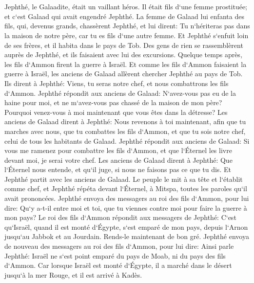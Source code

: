 \chapter{}

\verse Jephthé, le Galaadite, était un vaillant héros. Il était fils d`une femme prostituée; et c`est Galaad qui avait engendré Jephthé. 
\verse La femme de Galaad lui enfanta des fils, qui, devenus grands, chassèrent Jephthé, et lui dirent: Tu n`hériteras pas dans la maison de notre père, car tu es fils d`une autre femme. 
\verse Et Jephthé s`enfuit loin de ses frères, et il habita dans le pays de Tob. Des gens de rien se rassemblèrent auprès de Jephthé, et ils faisaient avec lui des excursions. 
\verse Quelque temps après, les fils d`Ammon firent la guerre à Israël. 
\verse Et comme les fils d`Ammon faisaient la guerre à Israël, les anciens de Galaad allèrent chercher Jephthé au pays de Tob. 
\verse Ils dirent à Jephthé: Viens, tu seras notre chef, et nous combattrons les fils d`Ammon. 
\verse Jephthé répondit aux anciens de Galaad: N`avez-vous pas eu de la haine pour moi, et ne m`avez-vous pas chassé de la maison de mon père? Pourquoi venez-vous à moi maintenant que vous êtes dans la détresse? 
\verse Les anciens de Galaad dirent à Jephthé: Nous revenons à toi maintenant, afin que tu marches avec nous, que tu combattes les fils d`Ammon, et que tu sois notre chef, celui de tous les habitants de Galaad. 
\verse Jephthé répondit aux anciens de Galaad: Si vous me ramenez pour combattre les fils d`Ammon, et que l`Éternel les livre devant moi, je serai votre chef. 
\verse Les anciens de Galaad dirent à Jephthé: Que l`Éternel nous entende, et qu`il juge, si nous ne faisons pas ce que tu dis. 
\verse Et Jephthé partit avec les anciens de Galaad. Le peuple le mit à sa tête et l`établit comme chef, et Jephthé répéta devant l`Éternel, à Mitspa, toutes les paroles qu`il avait prononcées. 
\verse Jephthé envoya des messagers au roi des fils d`Ammon, pour lui dire: Qu`y a-t-il entre moi et toi, que tu viennes contre moi pour faire la guerre à mon pays? 
\verse Le roi des fils d`Ammon répondit aux messagers de Jephthé: C`est qu`Israël, quand il est monté d`Égypte, s`est emparé de mon pays, depuis l`Arnon jusqu`au Jabbok et au Jourdain. Rends-le maintenant de bon gré. 
\verse Jephthé envoya de nouveau des messagers au roi des fils d`Ammon, 
\verse pour lui dire: Ainsi parle Jephthé: Israël ne s`est point emparé du pays de Moab, ni du pays des fils d`Ammon. 
\verse Car lorsque Israël est monté d`Égypte, il a marché dans le désert jusqu`à la mer Rouge, et il est arrivé à Kadès. 

